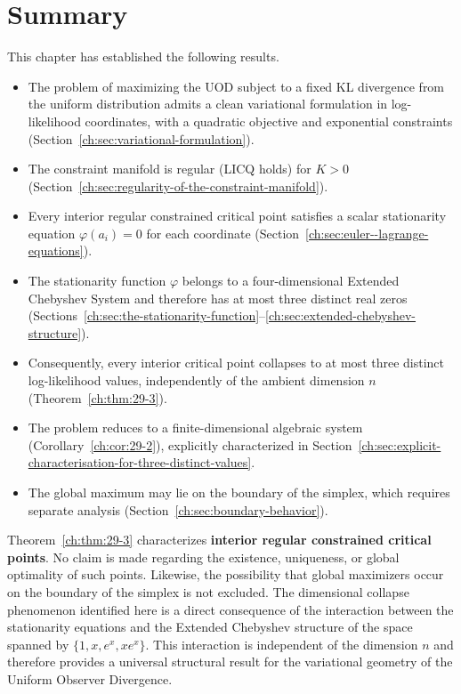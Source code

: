 \section{Summary}\label{ch:sec:summary-variational}
This chapter has established the following results.
\begin{itemize}
\item The problem of maximizing the UOD subject to a fixed KL divergence from the uniform distribution admits a clean variational formulation in log-likelihood coordinates, with a quadratic objective and exponential constraints (Section~\ref{ch:sec:variational-formulation}).
\item The constraint manifold is regular (LICQ holds) for \(K>0\) (Section~\ref{ch:sec:regularity-of-the-constraint-manifold}).
\item Every interior regular constrained critical point satisfies a scalar stationarity equation \(\varphi(a_i)=0\) for each coordinate (Section~\ref{ch:sec:euler--lagrange-equations}).
\item The stationarity function \(\varphi\) belongs to a four-dimensional Extended Chebyshev System and therefore has at most three distinct real zeros (Sections~\ref{ch:sec:the-stationarity-function}--\ref{ch:sec:extended-chebyshev-structure}).
\item Consequently, every interior critical point collapses to at most three distinct log-likelihood values, independently of the ambient dimension \(n\) (Theorem~\ref{ch:thm:29-3}).
\item The problem reduces to a finite-dimensional algebraic system (Corollary~\ref{ch:cor:29-2}), explicitly characterized in Section~\ref{ch:sec:explicit-characterisation-for-three-distinct-values}.
\item The global maximum may lie on the boundary of the simplex, which requires separate analysis (Section~\ref{ch:sec:boundary-behavior}).
\end{itemize}
Theorem~\ref{ch:thm:29-3} characterizes \textbf{interior regular constrained critical points}. No claim is made regarding the existence, uniqueness, or global optimality of such points. Likewise, the possibility that global maximizers occur on the boundary of the simplex is not excluded.
The dimensional collapse phenomenon identified here is a direct consequence of the interaction between the stationarity equations and the Extended Chebyshev structure of the space spanned by \(\{1,x,e^x,xe^x\}\). This interaction is independent of the dimension \(n\) and therefore provides a universal structural result for the variational geometry of the Uniform Observer Divergence.
